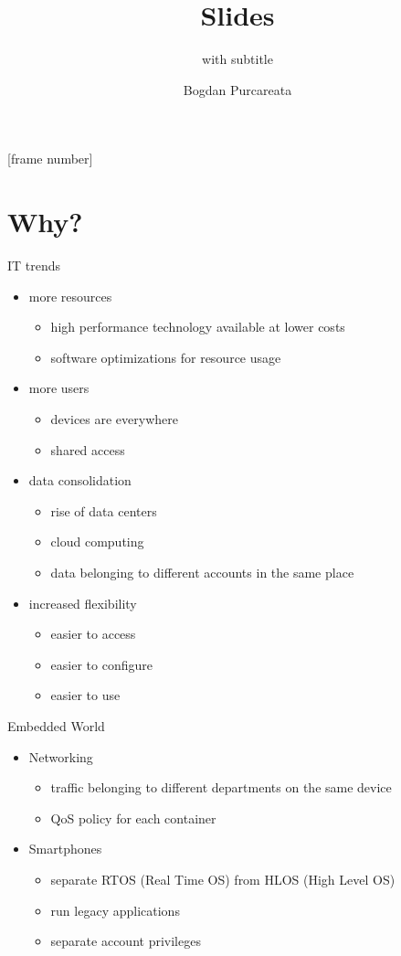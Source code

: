 \documentclass{beamer}
\title{Slides}
\subtitle{with subtitle}
\author{Bogdan Purcareata}
\begin{document}
[frame number]

\frame{\titlepage}

\frame{\tableofcontents}

\section{Why?}

\begin{frame}{IT trends}
\begin{itemize}
\item more resources
\begin{itemize}
\item high performance technology available at lower costs
\item software optimizations for resource usage
\end{itemize}
\item more users
\begin{itemize}
\item devices are everywhere
\item shared access
\end{itemize}
\item data consolidation
\begin{itemize}
\item rise of data centers
\item cloud computing
\item data belonging to different accounts in the same place
\end{itemize}
\item increased flexibility
\begin{itemize}
\item easier to access
\item easier to configure
\item easier to use
\end{itemize}
\end{itemize}
\end{frame}

\begin{frame}{Embedded World}
\begin{itemize}
\item Networking
\begin{itemize}
\item traffic belonging to different departments on the same device
\item QoS policy for each container
\end{itemize}
\item Smartphones
\begin{itemize}
\item separate RTOS (Real Time OS) from HLOS (High Level OS)
\item run legacy applications
\item separate account privileges
\end{itemize}
\end{itemize}
\end{frame}
\end{document}
